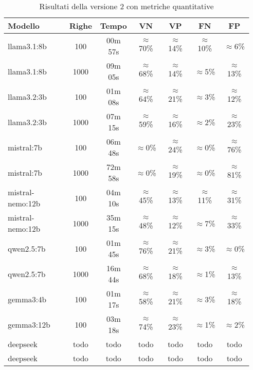 \documentclass[12pt]{report}
\begin{document}
\begin{table}[h!]
    \centering
    \begin{tabular}{|l|c|c|c|c|c|c|}
        \hline
        \textbf{Modello} & \textbf{Righe} & \textbf{Tempo} & \textbf{VN}   & \textbf{VP}   & \textbf{FN}   & \textbf{FP}   \\ \hline
        llama3.1:8b      & 100            & 00m 57s        & $\approx$70\% & $\approx$14\% & $\approx$10\% & $\approx$6\%  \\ \hline
        llama3.1:8b      & 1000           & 09m 05s        & $\approx$68\% & $\approx$14\% & $\approx$5\%  & $\approx$13\% \\ \hline
        llama3.2:3b      & 100            & 01m 08s        & $\approx$64\% & $\approx$21\% & $\approx$3\%  & $\approx$12\% \\ \hline
        llama3.2:3b      & 1000           & 07m 15s        & $\approx$59\% & $\approx$16\% & $\approx$2\%  & $\approx$23\% \\ \hline
        mistral:7b       & 100            & 06m 48s        & $\approx$0\%  & $\approx$24\% & $\approx$0\%  & $\approx$76\% \\ \hline
        mistral:7b       & 1000           & 72m 58s        & $\approx$0\%  & $\approx$19\% & $\approx$0\%  & $\approx$81\% \\ \hline
        mistral-nemo:12b & 100            & 04m 10s        & $\approx$45\% & $\approx$13\% & $\approx$11\% & $\approx$31\% \\ \hline
        mistral-nemo:12b & 1000           & 35m 15s        & $\approx$48\% & $\approx$12\% & $\approx$7\%  & $\approx$33\% \\ \hline
        qwen2.5:7b       & 100            & 01m 45s        & $\approx$76\% & $\approx$21\% & $\approx$3\%  & $\approx$0\%  \\ \hline
        qwen2.5:7b       & 1000           & 16m 44s        & $\approx$68\% & $\approx$18\% & $\approx$1\%  & $\approx$13\% \\ \hline
        gemma3:4b        & 100            & 01m 17s        & $\approx$58\% & $\approx$21\% & $\approx$3\%  & $\approx$18\% \\ \hline
        gemma3:12b       & 100            & 03m 18s        & $\approx$74\% & $\approx$23\% & $\approx$1\%  & $\approx$2\%  \\ \hline
        deepseek         & todo           & todo           & todo          & todo          & todo          & todo          \\ \hline
        deepseek         & todo           & todo           & todo          & todo          & todo          & todo          \\ \hline
    \end{tabular}
    \caption{Risultati della versione 2 con metriche quantitative}
    \label{tab:risultati_v2}
\end{table}
\end{document}
